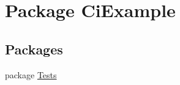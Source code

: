 \hypertarget{namespace_ci_example}{\section{Package Ci\-Example}
\label{namespace_ci_example}
}
\subsection*{Packages}
\begin{DoxyCompactItemize}
\item 
package \hyperlink{namespace_ci_example_1_1_tests}{Tests}
\end{DoxyCompactItemize}
